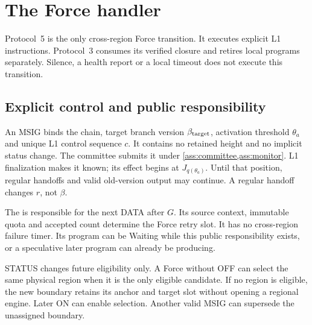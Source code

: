 \section{The Force handler}
\label{sec:force}
Protocol~5 is the only cross-region Force transition. It executes
explicit L1 instructions. Protocol~3 consumes its verified closure
and retires local programs separately. Silence, a health report or a
local timeout does not execute this transition.

\subsection{Explicit control and public responsibility}
\label{sec:force-stages}
An MSIG binds the chain, target branch version $\beta_{\rm target}$,
activation threshold $\theta_a$ and unique L1 control sequence $c$.
It contains no retained height and no implicit status change.
The committee submits it under \cref{ass:committee,ass:monitor}.
L1 finalization makes it known; its effect begins at $J_{q(\theta_a)}$.
Until that position, regular handoffs and valid old-version output
may continue. A regular handoff changes $r$, not $\beta$.

The  is responsible for the next DATA after
$G$. Its source context, immutable quota and accepted count determine
the Force retry slot. It has no cross-region failure timer.
Its program can be Waiting while this public responsibility exists,
or a speculative later program can already be producing.

STATUS changes future eligibility only. A Force without OFF can select
the same physical region when it is the only eligible candidate.
If no region is eligible, the new boundary retains its anchor and target
slot without opening a regional engine. Later ON can enable selection.
Another valid MSIG can supersede the unassigned boundary.

